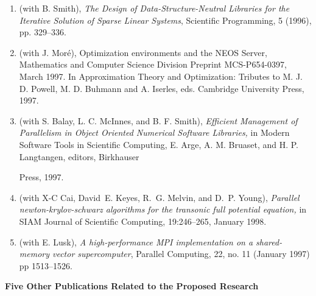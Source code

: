 \begin{enumerate}
\setlength{\itemsep}{0pt}
\setlength{\parsep}{0pt}

\item 
(with B. Smith), {\it The Design of Data-Structure-Neutral
Libraries for the Iterative Solution of Sparse Linear Systems}, 
Scientific Programming, 5 (1996), pp. 329--336.

\item
(with J. Mor\'e), Optimization environments and the NEOS Server,
Mathematics and Computer Science Division Preprint MCS-P654-0397,
March 1997. In Approximation Theory and Optimization: 
Tributes to M. J. D. Powell, M. D. Buhmann and A. Iserles, eds.
Cambridge University Press, 1997.

\item
(with S. Balay, L. C. McInnes, and
B. F. Smith), {\em Efficient Management of Parallelism in Object
 Oriented
Numerical Software Libraries,} in Modern Software Tools in
 Scientific
Computing, E. Arge, A. M. Bruaset, and H. P. Langtangen, editors, Birkhauser
 
Press, 1997.

\item
(with X-C Cai, David~E. Keyes, R.~G. Melvin, and D.~P. Young),
{\em Parallel newton-krylov-schwarz algorithms for the transonic full
  potential equation,} in SIAM Journal of Scientific Computing,
 19:246--265,
January   1998.

\item 
(with E. Lusk), {\em A high-performance MPI implementation
on a shared-memory vector supercomputer}, Parallel Computing, 22, no.
 11
(January 1997) pp 1513--1526.

\end{enumerate}

\newpage

\bigskip\noindent
{\bf Five Other Publications Related to the Proposed
 Research}

